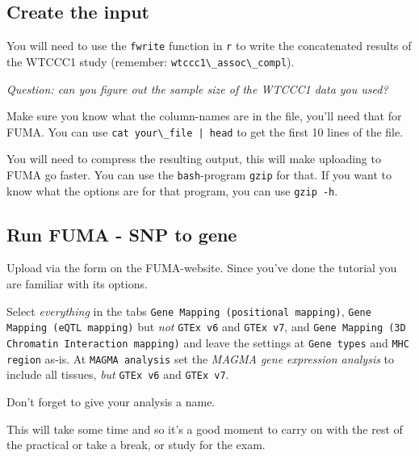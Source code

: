 \documentclass[
]{book}
\newcommand{\passthrough}[1]{#1}
\begin{document}
\hypertarget{create-the-input}{%
\subsection{Create the input}\label{create-the-input}}

You will need to use the \passthrough{\lstinline!fwrite!} function in \passthrough{\lstinline!r!} to write the concatenated results of the WTCCC1 study (remember: \passthrough{\lstinline!wtccc1\_assoc\_compl!}).

\emph{Question: can you figure out the sample size of the WTCCC1 data you used?}

Make sure you know what the column-names are in the file, you'll need that for FUMA. You can use \passthrough{\lstinline!cat your\_file | head!} to get the first 10 lines of the file.

You will need to compress the resulting output, this will make uploading to FUMA go faster. You can use the \passthrough{\lstinline!bash!}-program \passthrough{\lstinline!gzip!} for that. If you want to know what the options are for that program, you can use \passthrough{\lstinline!gzip -h!}.

\hypertarget{run-fuma---snp-to-gene}{%
\subsection{Run FUMA - SNP to gene}\label{run-fuma---snp-to-gene}}

Upload via the form on the FUMA-website. Since you've done the tutorial you are familiar with its options.

Select \emph{everything} in the tabs \passthrough{\lstinline!Gene Mapping (positional mapping)!}, \passthrough{\lstinline!Gene Mapping (eQTL mapping)!} but \emph{not} \passthrough{\lstinline!GTEx v6!} and \passthrough{\lstinline!GTEx v7!}, and \passthrough{\lstinline!Gene Mapping (3D Chromatin Interaction mapping)!} and leave the settings at \passthrough{\lstinline!Gene types!} and \passthrough{\lstinline!MHC region!} as-is. At \passthrough{\lstinline!MAGMA analysis!} set the \emph{MAGMA gene expression analysis} to include all tissues, \emph{but} \passthrough{\lstinline!GTEx v6!} and \passthrough{\lstinline!GTEx v7!}.

Don't forget to give your analysis a name.

This will take some time and so it's a good moment to carry on with the rest of the practical or take a break, or study for the exam.
\end{document}
